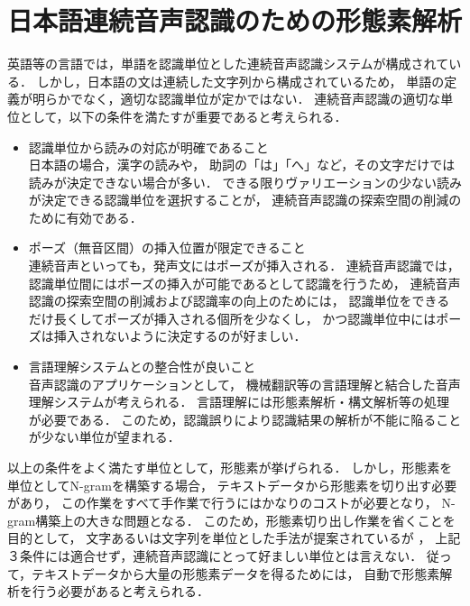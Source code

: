 \section{日本語連続音声認識のための形態素解析}
  英語等の言語では，単語を認識単位とした連続音声認識システムが構成されている．
  しかし，日本語の文は連続した文字列から構成されているため，
  単語の定義が明らかでなく，適切な認識単位が定かではない．
  連続音声認識の適切な単位として，以下の条件を満たすが重要であると考えられる．
\begin{itemize}
\item 認識単位から読みの対応が明確であること \\
  日本語の場合，漢字の読みや，
  助詞の「は」「へ」など，その文字だけでは読みが決定できない場合が多い．
  できる限りヴァリエーションの少ない読みが決定できる認識単位を選択することが，
  連続音声認識の探索空間の削減のために有効である．
\item ポーズ（無音区間）の挿入位置が限定できること \\
  連続音声といっても，発声文にはポーズが挿入される．
  連続音声認識では，認識単位間にはポーズの挿入が可能であるとして認識を行うため，
  連続音声認識の探索空間の削減および認識率の向上のためには，
  認識単位をできるだけ長くしてポーズが挿入される個所を少なくし，
  かつ認識単位中にはポーズは挿入されないように決定するのが好ましい．
\item 言語理解システムとの整合性が良いこと \\
  音声認識のアプリケーションとして，
  機械翻訳等の言語理解と結合した音声理解システムが考えられる．
  言語理解には形態素解析・構文解析等の処理が必要である．
  このため，認識誤りにより認識結果の解析が不能に陥ることが少ない単位が望まれる．
\end{itemize}
以上の条件をよく満たす単位として，形態素が挙げられる．
しかし，形態素を単位としてN-gramを構築する場合，
テキストデータから形態素を切り出す必要があり，
この作業をすべて手作業で行うにはかなりのコストが必要となり，
N-gram構築上の大きな問題となる．
このため，形態素切り出し作業を省くことを目的として，
文字あるいは文字列を単位とした手法が提案されているが
\cite{Yamada1}\cite{Yamada2}\cite{Itoh}，
上記３条件には適合せず，連続音声認識にとって好ましい単位とは言えない．
従って，テキストデータから大量の形態素データを得るためには，
自動で形態素解析を行う必要があると考えられる．

\vspace{3mm}

